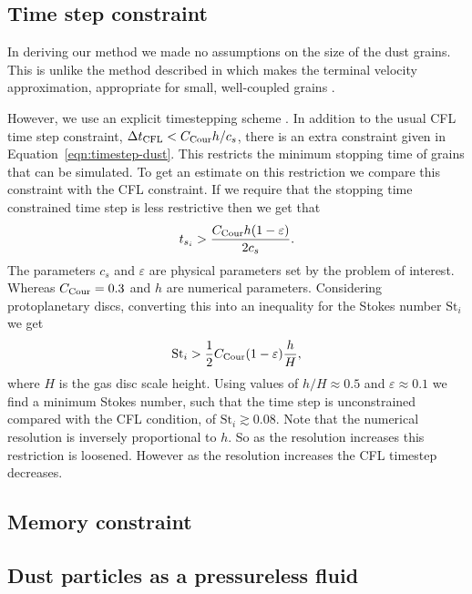 \documentclass[fleqn,usenatbib]{mnras}
\begin{document}
\subsection{Time step constraint}

In deriving our method we made no assumptions on the size of the dust grains.
This is unlike the method described in \citet{Hutchison2018MNRAS.476.2186H}
which makes the terminal velocity approximation, appropriate for small,
well-coupled grains \citep{Youdin2005ApJ...620..459Y}.

However, we use an explicit timestepping scheme
\citep{Price2018PASA...35...31P}. In addition to the usual CFL time step
constraint, \(\Delta t_{\rm CFL} < C_{\rm Cour} h/c_s\), there is an
extra constraint given in Equation~\ref{eqn:timestep-dust}. This restricts the
minimum stopping time of grains that can be simulated. To get an estimate on
this restriction we compare this constraint with the CFL constraint. If we
require that the stopping time constrained time step is less restrictive then we
get that
%
\begin{align}
   t_{s_i} > \frac{C_{\rm Cour} h (1 - \varepsilon)}{2 c_s}.
\end{align}
%
The parameters \(c_s\) and \(\varepsilon\) are physical parameters set by the
problem of interest. Whereas \(C_{\rm Cour} = 0.3\) and \(h\) are numerical
parameters. Considering protoplanetary discs, converting this into an inequality
for the Stokes number \(\mathrm{St}_i\) we get
%
\begin{align}
   \mathrm{St}_i > \frac{1}{2} C_{\rm Cour} (1 - \varepsilon) \frac{h}{H},
\end{align}
%
where \(H\) is the gas disc scale height. Using values of \(h/H \approx 0.5\)
and \(\varepsilon \approx 0.1\) we find a minimum Stokes number, such that the
time step is unconstrained compared with the CFL condition, of \(\mathrm{St}_i
\gtrsim 0.08\). Note that the numerical resolution is inversely proportional to
\(h\). So as the resolution increases this restriction is loosened. However as
the resolution increases the CFL timestep decreases.


\subsection{Memory constraint}


\subsection{Dust particles as a pressureless fluid}
\end{document}
